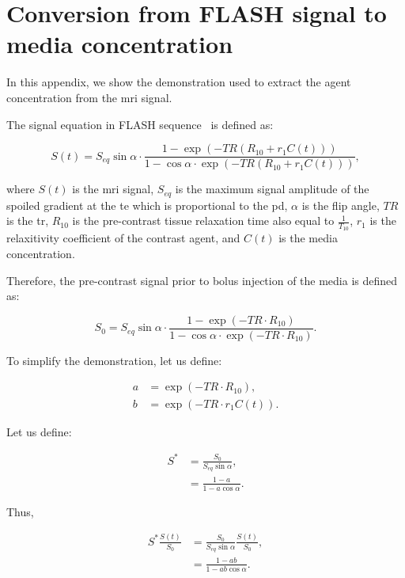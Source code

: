 \appendix
\section{Conversion from FLASH signal to media concentration}\label{app:signaltoconc}

In this appendix, we show the demonstration used to extract the agent concentration from the \ac{mri} signal.

The signal equation in FLASH sequence~\citep{haase1986flash} is defined as:

\begin{equation}
  S(t) = S_{eq} \sin \alpha \cdot \frac{1 - \exp\left(-TR\left(R_{10} + r_1 C(t)\right)\right)}{1 - \cos \alpha \cdot \exp\left(-TR\left(R_{10} + r_1 C(t)\right)\right)} ,
  \label{eq:app:flash}
\end{equation}

\noindent where $S(t)$ is the \ac{mri} signal, $S_{eq}$ is the maximum signal amplitude of the spoiled gradient at the \ac{te} which is proportional to the \ac{pd}, $\alpha$ is the flip angle, $TR$ is the \acf{tr}, $R_{10}$ is the pre-contrast tissue relaxation time also equal to $\frac{1}{T_{10}}$, $r_1$ is the relaxitivity coefficient of the contrast agent, and $C(t)$ is the media concentration.

Therefore, the pre-contrast signal prior to bolus injection of the media is defined as:

\begin{equation}
  S_0 = S_{eq} \sin \alpha \cdot \frac{1 - \exp\left(-TR \cdot R_{10}\right)}{1 - \cos \alpha \cdot \exp\left(-TR \cdot R_{10}\right)} .
  \label{eq:app:precontrast}
\end{equation}

To simplify the demonstration, let us define:

\begin{align}
  a &= \exp(-TR \cdot R_{10}) , \\
  b &= \exp(-TR \cdot r_1 C(t)) .
\end{align}

Let us define:

\begin{align}
  S^{*} &= \frac{S_0}{S_{eq} \sin \alpha} , \\
  &= \frac{1 - a}{1 - a \cos \alpha} .
\end{align}

Thus,

\begin{align}
  S^{*}\frac{S(t)}{S_0} &= \frac{S_0}{S_{eq}\sin \alpha} \frac{S(t)}{S_0} , \\
  &= \frac{1 - a b}{1 - a b \cos \alpha} .
\end{align}

